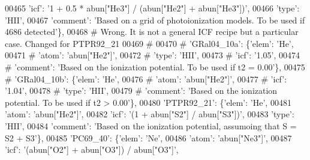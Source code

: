 \begin{DoxyCode}
00465                                       \textcolor{stringliteral}{'icf'}: \textcolor{stringliteral}{'1 + 0.5 * abun["He3"] / (abun["He2"] + abun["He3"])'},
00466                                       \textcolor{stringliteral}{'type'}: \textcolor{stringliteral}{'HII'},
00467                                       \textcolor{stringliteral}{'comment'}: \textcolor{stringliteral}{'Based on a grid of photoionization models. To be used if
       4686 detected'}\},
00468 \textcolor{comment}{# Wrong. It is not a general ICF recipe but a particular case. Changed for PTPR92\_21}
00469 \textcolor{comment}{#}
00470 \textcolor{comment}{#                         'GRal04\_10a': \{'elem': 'He',}
00471 \textcolor{comment}{#                                      'atom': 'abun["He2"]',}
00472 \textcolor{comment}{#                                      'type': 'HII',}
00473 \textcolor{comment}{#                                      'icf': '1.05',}
00474 \textcolor{comment}{#                                      'comment': 'Based on the ionization potential. To be used if t2 =
       0.00'\},}
00475 \textcolor{comment}{#                         'GRal04\_10b': \{'elem': 'He',}
00476 \textcolor{comment}{#                                      'atom': 'abun["He2"]',}
00477 \textcolor{comment}{#                                      'icf': '1.04',}
00478 \textcolor{comment}{#                                      'type': 'HII',}
00479 \textcolor{comment}{#                                      'comment': 'Based on the ionization potential. To be used if t2 >
       0.00'\},}
00480                          \textcolor{stringliteral}{'PTPR92\_21'}: \{\textcolor{stringliteral}{'elem'}: \textcolor{stringliteral}{'He'},
00481                                       \textcolor{stringliteral}{'atom'}: \textcolor{stringliteral}{'abun["He2"]'},
00482                                       \textcolor{stringliteral}{'icf'}: \textcolor{stringliteral}{'(1 + abun["S2"] / abun["S3"])'},
00483                                       \textcolor{stringliteral}{'type'}: \textcolor{stringliteral}{'HII'},
00484                                       \textcolor{stringliteral}{'comment'}: \textcolor{stringliteral}{'Based on the ionization potential, assumoing that S = S2
       + S3'}\},
00485                          \textcolor{stringliteral}{'PC69\_40'}: \{\textcolor{stringliteral}{'elem'}: \textcolor{stringliteral}{'Ne'},
00486                                     \textcolor{stringliteral}{'atom'}: \textcolor{stringliteral}{'abun["Ne3"]'},
00487                                    \textcolor{stringliteral}{'icf'}: \textcolor{stringliteral}{'(abun["O2"] + abun["O3"]) / abun["O3"]'},

\end{DoxyCode}
